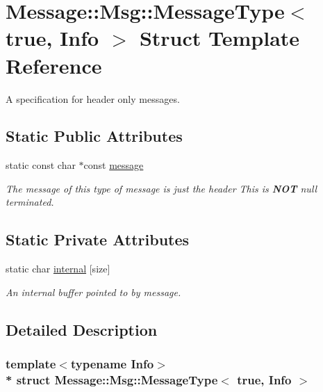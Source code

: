 \hypertarget{struct_message_1_1_msg_1_1_message_type_3_01true_00_01_info_01_4}{}\section{Message\+:\+:Msg\+:\+:Message\+Type$<$ true, Info $>$ Struct Template Reference}
\label{struct_message_1_1_msg_1_1_message_type_3_01true_00_01_info_01_4}


A specification for header only messages.  


\subsection*{Static Public Attributes}
\begin{DoxyCompactItemize}
\item 
static const char $\ast$const \hyperlink{struct_message_1_1_msg_1_1_message_type_3_01true_00_01_info_01_4_af95de5744fd55ef53ddc12587b4be239}{message}
\begin{DoxyCompactList}\small\item\em The message of this type of message is just the header This is {\bfseries N\+OT} null terminated. \end{DoxyCompactList}\end{DoxyCompactItemize}
\subsection*{Static Private Attributes}
\begin{DoxyCompactItemize}
\item 
static char \hyperlink{struct_message_1_1_msg_1_1_message_type_3_01true_00_01_info_01_4_ac84b1b4f1d2d30f0dbf5689ddc471955}{internal} \mbox{[}size\mbox{]}
\begin{DoxyCompactList}\small\item\em An internal buffer pointed to by message. \end{DoxyCompactList}\end{DoxyCompactItemize}


\subsection{Detailed Description}
\subsubsection*{template$<$typename Info$>$\\*
struct Message\+::\+Msg\+::\+Message\+Type$<$ true, Info $>$}

